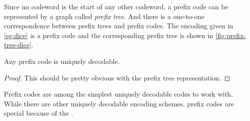 \documentclass[a4paper]{article}
\begin{document}
\begin{remark}
	Since no codeword is the start of any other codeword,
	a prefix code can be represented by a graph called \emph{prefix tree}.
	And there is a one-to-one correspondence between prefix trees and prefix codes.
	The encoding given in \autoref{eg:dice} is a prefix code
	and the corresponding prefix tree is shown in \autoref{fig:prefix-tree-dice}.
\end{remark}


\begin{lemma}
	Any prefix code is uniquely decodable.
\end{lemma}
\begin{proof}
	This should be pretty obvious with the prefix tree representation.
\end{proof}


\begin{remark}
	Prefix codes are among the simplest uniquely decodable codes to work with.
	While there are other uniquely decodable encoding schemes,
	prefix codes are special because of the .
\end{remark}
\end{document}
